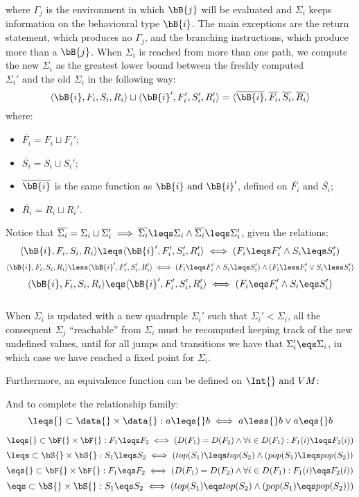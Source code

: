 where $\Gamma_{j}$ is the environment in which $\bB{j}$ will be evaluated and $\Sigma_i$ keeps information on the behavioural type $\bB{i}$. The main exceptions are the return statement, which produces no $\Gamma_j$, and the branching instructions, which produce more than a $\bB{j}$. When $\Sigma_i$ is reached from more than one path, we compute the new $\Sigma_i$ as the greatest lower bound between the freshly computed $\Sigma_i' \text{ and the old }\Sigma_i$ in the following way:
\[\langle \bB{i}, F_i, S_i, R_i \rangle \sqcup \langle \bB{i}', F_i', S_i', R_i' \rangle = \langle \overline{\bB{i}}, \overline{F_i}, \overline{S_i}, \overline{R_i} \rangle\]
where:
\begin{itemize}
\item $\overline{F_i} = F_i \sqcup F_i'$;
\item $\overline{S_i} = S_i \sqcup S_i'$;
\item $\overline{\bB{i}}$ is the same function as $\bB{i} \text{ and } \bB{i}'$, defined on $\overline{F_i} \text{ and }\overline{S_i}$;
\item $\overline{R_i} = R_i \sqcup R_i'$.
\end{itemize}
Notice that $\overline{\Sigma_i} = \Sigma_i \sqcup \Sigma_i' \implies \overline{\Sigma_i} \leqs \Sigma_i \wedge \overline{\Sigma_i} \leqs \Sigma_i'$, given the relations:\\
\[\langle \bB{i}, F_i, S_i, R_i \rangle \leqs \langle \bB{i}', F_i', S_i', R_i' \rangle \iff (F_i \leqs F_i' \wedge S_i \leqs S_i')\]
\[\langle \bB{i}, F_i, S_i, R_i \rangle \less \langle \bB{i}', F_i', S_i', R_i' \rangle \iff (F_i \leqs F_i' \wedge S_i \leqs S_i') \wedge (F_i \less F_i' \vee S_i \less S_i')\]
\[\langle \bB{i}, F_i, S_i, R_i \rangle \eqs \langle \bB{i}', F_i', S_i', R_i' \rangle \iff (F_i \eqs F_i' \wedge S_i \eqs S_i')\]\\
When $\Sigma_i$ is updated with a new quadruple $\Sigma_i'$ such that $\Sigma_i' \less{} \Sigma_i$, all the consequent $\Sigma_j$ ``reachable'' from $\Sigma_i$ must be recomputed keeping track of the new undefined values, until for all jumps and transitions we have that $\Sigma_i' \eqs \Sigma_i$, in which case we have reached a fixed point for $\Sigma_i$.



Furthermore, an equivalence function can be defined on $\Int{} \text{ and } VM$:

And to complete the relationship family:
\[\leqs{} \subset \data{} \times \data{}: a \leqs{} b \iff a \less{} b \vee a \eqs{} b\]



\[\leqs{} \subset \bF{} \times \bF{}: F_1 \leqs F_2 \iff (D(F_1) = D(F_2) \wedge \forall i \in D(F_1): F_1(i) \leqs F_2(i))\]
\[\leqs \subset \bS{} \times \bS{}: S_1 \leqs S_2 \iff (top(S_1) \leqs top(S_2) \wedge (pop(S_1) \leqs pop(S_2))\]
\[\eqs{} \subset \bF{} \times \bF{}: F_1 \eqs F_2 \iff (D(F_1) = D(F_2) \wedge \forall i \in D(F_1): F_1(i) \eqs F_2(i))\]
\[\eqs \subset \bS{} \times \bS{}: S_1 \eqs S_2 \iff (top(S_1) \eqs top(S_2) \wedge (pop(S_1) \eqs pop(S_2)))\]\\


